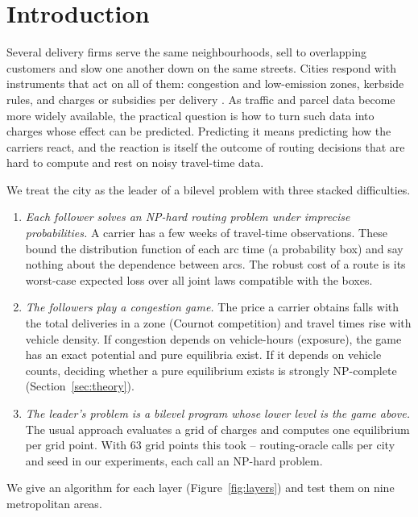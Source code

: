 \documentclass[preprint,11pt]{elsarticle}
\theoremstyle{definition}
\theoremstyle{remark}
\begin{document}


\section{Introduction}\label{sec:intro}

Several delivery firms serve the same neighbourhoods, sell to overlapping customers and slow one another down on the same streets. Cities respond with instruments that act on all of them: congestion and low-emission zones, kerbside rules, and charges or subsidies per delivery \citep{Quak2009,HolguinVeras2016,Dey2019,XuSun2024}. As traffic and parcel data become more widely available, the practical question is how to turn such data into charges whose effect can be predicted. Predicting it means predicting how the carriers react, and the reaction is itself the outcome of routing decisions that are hard to compute and rest on noisy travel-time data.

We treat the city as the leader of a bilevel problem with three stacked difficulties.
\begin{enumerate}[label=(\arabic*),leftmargin=*,itemsep=0pt]
\item \emph{Each follower solves an NP-hard routing problem under imprecise probabilities.} A carrier has a few weeks of travel-time observations. These bound the distribution function of each arc time (a probability box) and say nothing about the dependence between arcs. The robust cost of a route is its worst-case expected loss over all joint laws compatible with the boxes.
\item \emph{The followers play a congestion game.} The price a carrier obtains falls with the total deliveries in a zone (Cournot competition) and travel times rise with vehicle density. If congestion depends on vehicle-hours (exposure), the game has an exact potential and pure equilibria exist. If it depends on vehicle counts, deciding whether a pure equilibrium exists is strongly NP-complete (Section~\ref{sec:theory}).
\item \emph{The leader's problem is a bilevel program whose lower level is the game above.} The usual approach evaluates a grid of charges and computes one equilibrium per grid point. With 63 grid points this took \GridCallsFullMin--\GridCallsFullMax{} routing-oracle calls per city and seed in our experiments, each call an NP-hard problem.
\end{enumerate}
We give an algorithm for each layer (Figure~\ref{fig:layers}) and test them on nine metropolitan areas.
\end{document}
